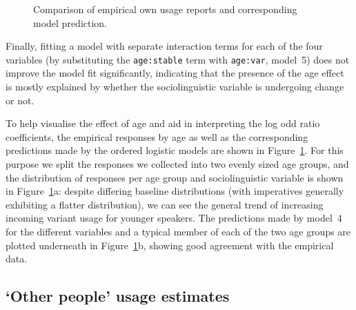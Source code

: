\begin{figure}[!ht]

{\centering {}

}

\caption[Comparison of empirical own usage reports and corresponding model prediction]{Comparison of empirical own usage reports and corresponding model prediction.}\label{fig:selfresponsesprediction}
\end{figure}



Finally, fitting a model with separate interaction terms for each of the four variables (by substituting the \texttt{age:stable} term with \texttt{age:var}, model~5) does not improve the model fit significantly, indicating that the presence of the age effect is mostly explained by whether the sociolinguistic variable is undergoing change or not.

To help visualise the effect of age and aid in interpreting the log odd ratio coefficients, the empirical responses by age as well as the corresponding predictions made by the ordered logistic models are shown in Figure~\ref{fig:selfresponsesprediction}. For this purpose we split the responses we collected into two evenly sized age groups, %
and the distribution of responses per age group and sociolinguistic variable is shown in Figure~\ref{fig:selfresponsesprediction}a: despite differing baseline distributions (with imperatives generally exhibiting a flatter distribution), we can see the general trend of increasing incoming variant usage for younger speakers. The predictions made by model~4 for the different variables and a typical member of each of the two age groups are plotted underneath in Figure~\ref{fig:selfresponsesprediction}b, showing good agreement with the empirical data.

\subsection{`Other people' usage estimates}
\label{sec:otherresponses}

